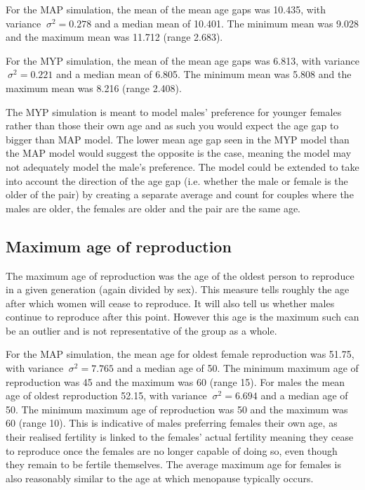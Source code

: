 \documentclass[authoryearcitations]{UoYCSproject}
\begin{document}
For the MAP simulation, the mean of the mean age gaps was 10.435, with variance $\ \sigma^2 = 0.278 $ and a median mean of 10.401. The minimum mean was 9.028 and the maximum mean was 11.712 (range 2.683). 

For the MYP simulation, the mean of the mean age gaps was 6.813, with variance $\ \sigma^2 = 0.221 $ and a median mean of 6.805. The minimum mean was 5.808 and the maximum mean was 8.216 (range 2.408).

The MYP simulation is meant to model males' preference for younger females rather than those their own age and as such you would expect the age gap to bigger than MAP model. The lower mean age gap seen in the MYP model than the MAP model would suggest the opposite is the case, meaning the model may not adequately model the male's preference. The model could be extended to take into account the direction of the age gap (i.e. whether the male or female is the older of the pair) by creating a separate average and  count for couples where the males are older, the females are older and the pair are the same age.

\subsection{Maximum age of reproduction}
The maximum age of reproduction was the age of the oldest person to reproduce in a given generation (again divided by sex). This measure tells roughly the age after which women will cease to reproduce. It will also tell us whether males continue to reproduce after this point. However this age is the maximum such can be an outlier and is not representative of the group as a whole. 

For the MAP simulation, the mean age for oldest female reproduction was 51.75, with variance $\ \sigma^2 = 7.765 $ and a median age of 50. The minimum maximum age of reproduction was 45 and the maximum was 60 (range 15). For males the mean age of oldest reproduction 52.15, with variance $\ \sigma^2 = 6.694 $ and a median age of 50. The minimum maximum age of reproduction was 50 and the maximum was 60 (range 10). This is indicative of males preferring females their own age, as their realised fertility is linked to the females' actual fertility meaning they cease to reproduce once the females are no longer capable of doing so, even though they remain to be fertile themselves. The average maximum age for females is also reasonably similar to the age at which menopause typically occurs.
\end{document}
